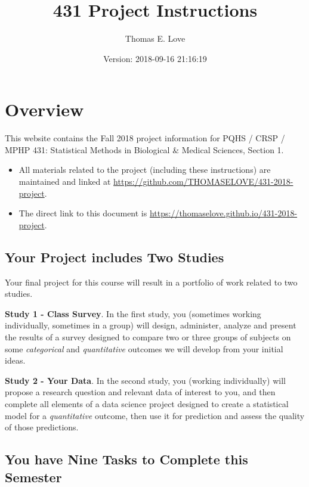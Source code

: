 \documentclass[]{book}
\title{431 Project Instructions}
\author{Thomas E. Love}
\date{Version: 2018-09-16 21:16:19}
\providecommand{\tightlist}{%
  \setlength{\itemsep}{0pt}\setlength{\parskip}{0pt}}
\theoremstyle{definition}
\theoremstyle{definition}
\theoremstyle{definition}
\theoremstyle{remark}
\begin{document}
\maketitle

{
\setcounter{tocdepth}{1}
\tableofcontents
}
\hypertarget{overview}{%
\chapter*{Overview}\label{overview}}

This website contains the Fall 2018 project information for PQHS / CRSP
/ MPHP 431: Statistical Methods in Biological \& Medical Sciences,
Section 1.

\begin{itemize}
\tightlist
\item
  All materials related to the project (including these instructions)
  are maintained and linked at
  \url{https://github.com/THOMASELOVE/431-2018-project}.
\item
  The direct link to this document is
  \url{https://thomaselove.github.io/431-2018-project}.
\end{itemize}

\hypertarget{your-project-includes-two-studies}{%
\section*{Your Project includes Two
Studies}\label{your-project-includes-two-studies}}

Your final project for this course will result in a portfolio of work
related to two studies.

\textbf{Study 1 - Class Survey}. In the first study, you (sometimes
working individually, sometimes in a group) will design, administer,
analyze and present the results of a survey designed to compare two or
three groups of subjects on some \emph{categorical} and
\emph{quantitative} outcomes we will develop from your initial ideas.

\textbf{Study 2 - Your Data}. In the second study, you (working
individually) will propose a research question and relevant data of
interest to you, and then complete all elements of a data science
project designed to create a statistical model for a \emph{quantitative}
outcome, then use it for prediction and assess the quality of those
predictions.

\hypertarget{you-have-nine-tasks-to-complete-this-semester}{%
\section*{You have Nine Tasks to Complete this
Semester}\label{you-have-nine-tasks-to-complete-this-semester}}
\end{document}
